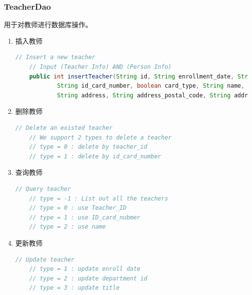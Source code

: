\documentclass[../report.tex]{subfiles}
\begin{document}
\subsubsection{TeacherDao}
用于对教师进行数据库操作。
\begin{enumerate}
\itemsep 0em
\item 插入教师\\
\begin{lstlisting}[language=java,backgroundcolor=\color{lightgray}]
    // Insert a new teacher
    // Input (Teacher Info) AND (Person Info)
    public int insertTeacher(String id, String enrollment_date, String department_id, String teacher_title,
            String id_card_number, boolean card_type, String name, boolean gender, String birthdate, String nationality,
            String address, String address_postal_code, String address_phone_number)
\end{lstlisting}
\item 删除教师\\
\begin{lstlisting}[language=java,backgroundcolor=\color{lightgray}]
    // Delete an existed teacher
    // We support 2 types to delete a teacher
    // type = 0 : delete by teacher_id
    // type = 1 : delete by id_card_number
\end{lstlisting}
\item 查询教师\\
\begin{lstlisting}[language=java,backgroundcolor=\color{lightgray}]
    // Query teacher
    // type = -1 : List out all the teachers
    // type = 0 : use Teacher_ID
    // type = 1 : use ID_card_nubmer
    // type = 2 : use name
\end{lstlisting}
\item 更新教师\\
\begin{lstlisting}[language=java,backgroundcolor=\color{lightgray}]
    // Update teacher
    // type = 1 : update enroll date
    // type = 2 : update department id
    // type = 3 : update title
\end{lstlisting}
\end{enumerate}
\end{document}
